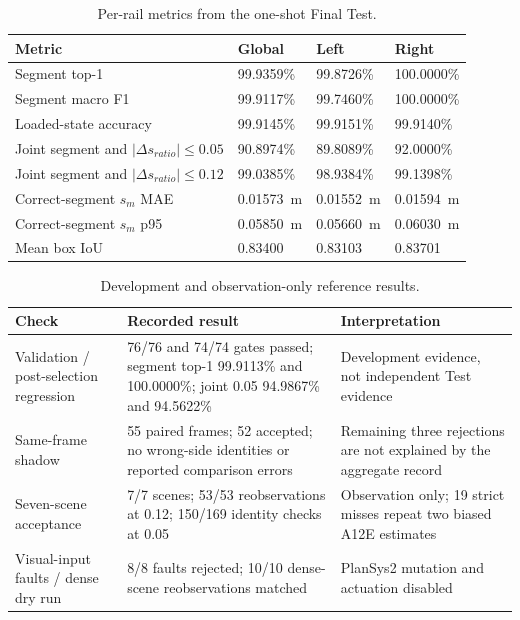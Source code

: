 \FloatBarrier

\begin{table}[htbp]
\centering
\small
\renewcommand{\arraystretch}{1.08}
\caption{Per-rail metrics from the one-shot Final Test.}
\label{tab:visual-v4-final-test-detailed}
\begin{tabularx}{\textwidth}{@{}Xp{}p{}p{}@{}}
\toprule
\textbf{Metric} & \textbf{Global} & \textbf{Left} & \textbf{Right}\\
\midrule
Segment top-1 & 99.9359\% & 99.8726\% & 100.0000\%\\ \tablerowrule
Segment macro F1 & 99.9117\% & 99.7460\% & 100.0000\%\\ \tablerowrule
Loaded-state accuracy & 99.9145\% & 99.9151\% & 99.9140\%\\ \tablerowrule
Joint segment and \(\lvert\Delta s_{ratio}\rvert\leq0.05\) & 90.8974\% &
89.8089\% & 92.0000\%\\ \tablerowrule
Joint segment and \(\lvert\Delta s_{ratio}\rvert\leq0.12\) & 99.0385\% &
98.9384\% & 99.1398\%\\ \tablerowrule
Correct-segment \(s_m\) MAE & \SI{0.01573}{m} & \SI{0.01552}{m} &
\SI{0.01594}{m}\\ \tablerowrule
Correct-segment \(s_m\) p95 & \SI{0.05850}{m} & \SI{0.05660}{m} &
\SI{0.06030}{m}\\ \tablerowrule
Mean box IoU & 0.83400 & 0.83103 & 0.83701\\
\bottomrule
\end{tabularx}
\end{table}

\begin{table}[htbp]
\centering
\footnotesize
\renewcommand{\arraystretch}{1.08}
\caption{Development and observation-only reference results.}
\label{tab:visual-v4-runtime-results}
\begin{tabularx}{\textwidth}{@{}p{}Xp{}@{}}
\toprule
\textbf{Check} & \textbf{Recorded result} & \textbf{Interpretation}\\
\midrule
Validation / post-selection regression & 76/76 and 74/74 gates passed;
segment top-1 99.9113\% and 100.0000\%; joint 0.05 94.9867\% and 94.5622\%
& Development evidence, not independent Test evidence\\ \tablerowrule
Same-frame shadow & 55 paired frames; 52 accepted; no wrong-side identities or
reported comparison errors & Remaining three rejections are not explained by
the aggregate record\\ \tablerowrule
Seven-scene acceptance & 7/7 scenes; 53/53 reobservations at 0.12; 150/169
identity checks at 0.05 & Observation only; 19 strict misses repeat two biased
A12E estimates\\ \tablerowrule
Visual-input faults / dense dry run & 8/8 faults rejected; 10/10 dense-scene
reobservations matched & PlanSys2 mutation and actuation disabled\\
\bottomrule
\end{tabularx}
\end{table}

